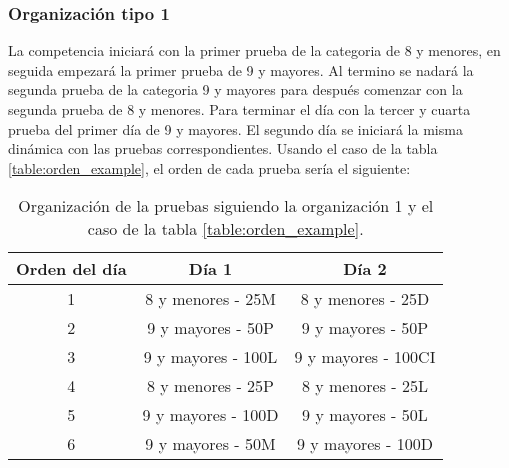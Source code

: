 \subsubsection{Organización tipo 1}
La competencia iniciará con la primer prueba de la categoria de 8 y menores, en seguida empezará la primer prueba de 9 y mayores. Al termino se nadará la segunda prueba de la categoria 9 y mayores para después comenzar con la segunda prueba de 8 y menores. Para terminar el día con la tercer y cuarta prueba del primer día de 9 y mayores. El segundo día se iniciará la misma dinámica con las pruebas correspondientes. Usando el caso de la tabla \ref{table:orden_example}, el orden de cada prueba sería el siguiente:
\begin{table}[H]
    \centering
    \begin{tabular}{ccc}
        \hline
        Orden del día & Día 1              & Día 2               \\  \hline
        1             & 8 y menores - 25M  & 8 y menores - 25D   \\
        2             & 9 y mayores - 50P  & 9 y mayores - 50P   \\
        3             & 9 y mayores - 100L & 9 y mayores - 100CI \\
        4             & 8 y menores - 25P  & 8 y menores - 25L   \\
        5             & 9 y mayores - 100D & 9 y mayores - 50L   \\
        6             & 9 y mayores - 50M  & 9 y mayores - 100D  \\ \hline
    \end{tabular}
    \caption{Organización de la pruebas siguiendo la organización 1 y el caso de la tabla \ref{table:orden_example}.}
    \label{table:organization1}
\end{table}

